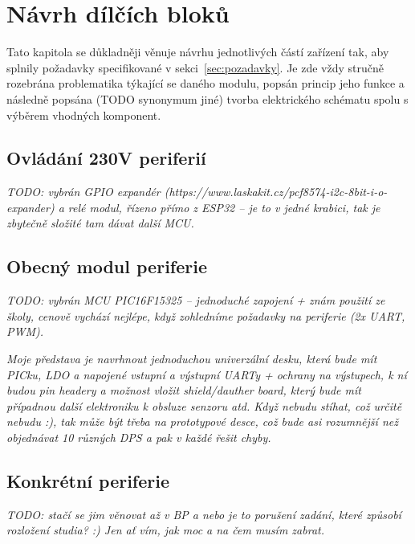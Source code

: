 \chapter{Návrh dílčích bloků}
\label{kap:navrh-dilnich-bloku}
    Tato kapitola se důkladněji věnuje návrhu jednotlivých částí zařízení tak, aby splnily požadavky specifikované v sekci~\ref{sec:pozadavky}. Je zde vždy stručně rozebrána problematika týkající se daného modulu, popsán princip jeho funkce a následně popsána (TODO synonymum jiné) tvorba elektrického schématu spolu s výběrem vhodných komponent.





\section{Ovládání 230V periferií}
    \textit{    TODO: vybrán GPIO expandér (https://www.laskakit.cz/pcf8574-i2c-8bit-i-o-expander) a relé modul, řízeno přímo z ESP32 -- je to v jedné krabici, tak je zbytečně složité tam dávat další MCU. } 
\section{Obecný modul periferie}
    \textit{    TODO: vybrán MCU PIC16F15325 -- jednoduché zapojení + znám použití ze školy, cenově vychází nejlépe, když zohledníme požadavky na periferie (2x UART, PWM). } 

    \textit{
        Moje představa je navrhnout jednoduchou univerzální desku, která bude mít PICku, LDO a napojené vstupní a výstupní UARTy + ochrany na výstupech, k ní budou pin headery a možnost vložit shield/dauther board, který bude mít případnou další elektroniku k obsluze senzoru atd. Když nebudu stíhat, což určitě nebudu :), tak může být třeba na prototypové desce, což bude asi rozumnější než objednávat 10 různých DPS a pak v každé řešit chyby.} 


    \section{Konkrétní periferie}
        \textit{TODO: stačí se jim věnovat až v BP a nebo je to porušení zadání, které způsobí rozložení studia? :) Jen ať vím, jak moc a na čem musím zabrat.}  



